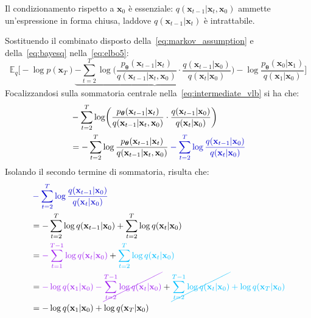 \begin{oss}
Il condizionamento rispetto a $\mathbf{x}_0$ è essenziale: $q(\mathbf{x}_{t-1}|\mathbf{x}_t,\mathbf{x}_0)$ ammette un'espressione 
in forma chiusa, laddove $q(\mathbf{x}_{t-1}|\mathbf{x}_t)$ è intrattabile.
\end{oss}
\noindent Sostituendo il combinato disposto della~\eqref{eq:markov_assumption} e della~\eqref{eq:bayesq} nella~\eqref{eq:elbo5}:
\begin{equation}
    \mathbb{E}_q\biggl[-\log p(\mathbf{x}_T)
    \underbrace{-\sum_{t=2}^T\log\biggl(\frac{p_{\bm{\theta}}(\mathbf{x}_{t-1}|\mathbf{x}_t)}{q(\mathbf{x}_{t-1}|\mathbf{x}_t,\mathbf{x}_0)}\cdot 
    \frac{q(\mathbf{x}_{t-1}|\mathbf{x}_0)}{q(\mathbf{x}_t|\mathbf{x}_0)}\biggr)}
    -\log\frac{p_{\bm{\theta}}(\mathbf{x}_0|\mathbf{x}_1)}{q(\mathbf{x}_1|\mathbf{x}_0)}\biggr] \label{eq:intermediate_vlb} 
\end{equation}
Focalizzandosi sulla sommatoria centrale nella~\eqref{eq:intermediate_vlb} si ha che:
\begin{equation}
\begin{split}
    &-\sum_{t=2}^T\log\biggl(\frac{p_{\bm{\theta}}(\mathbf{x}_{t-1}|\mathbf{x}_t)}{q(\mathbf{x}_{t-1}|\mathbf{x}_t,\mathbf{x}_0)}\cdot 
    \frac{q(\mathbf{x}_{t-1}|\mathbf{x}_0)}{q(\mathbf{x}_t|\mathbf{x}_0)}\biggr)\\
    &= -\sum_{t=2}^T\log\frac{p_{\bm{\theta}}(\mathbf{x}_{t-1}|\mathbf{x}_t)}{q(\mathbf{x}_{t-1}|\mathbf{x}_t,\mathbf{x}_0)}
    \mathcolor{Blue3}{-\sum_{t=2}^T\log\frac{q(\mathbf{x}_{t-1}|\mathbf{x}_0)}{q(\mathbf{x}_t|\mathbf{x}_0)}} \label{eq:intermediate_steps}
\end{split}
\end{equation}
Isolando il secondo termine di sommatoria, risulta che:
\begin{equation}
    \begin{split}
    &\mathcolor{Blue3}{-\sum_{t=2}^T\log\frac{q(\mathbf{x}_{t-1}|\mathbf{x}_0)}{q(\mathbf{x}_t|\mathbf{x}_0)}}\\
    &=-\sum_{t=2}^T\log q(\mathbf{x}_{t-1}|\mathbf{x}_0)+\sum_{t=2}^T\log q(\mathbf{x}_t|\mathbf{x}_0) \\
    &=\mathcolor{Purple0}{-\sum_{t=1}^{T-1}\log q(\mathbf{x}_t|\mathbf{x}_0)}+\mathcolor{DeepSkyBlue1}{\sum_{t=2}^T\log q(\mathbf{x}_t|\mathbf{x}_0)}\\
    &=\mathcolor{Purple0}{-\log q(\mathbf{x}_1|\mathbf{x}_0)-\cancel{\sum_{t=2}^{T-1}\log q(\mathbf{x}_t|\mathbf{x}_0)}}+\mathcolor{DeepSkyBlue1}{\cancel{\sum_{t=2}^{T-1}\log q(\mathbf{x}_t|\mathbf{x}_0)}+\log q(\mathbf{x}_T|\mathbf{x}_0)} \\
    &=-\log q(\mathbf{x}_1|\mathbf{x}_0)+\log q(\mathbf{x}_T|\mathbf{x}_0) \label{eq:intermediate_steps2}
\end{split}
\end{equation}
